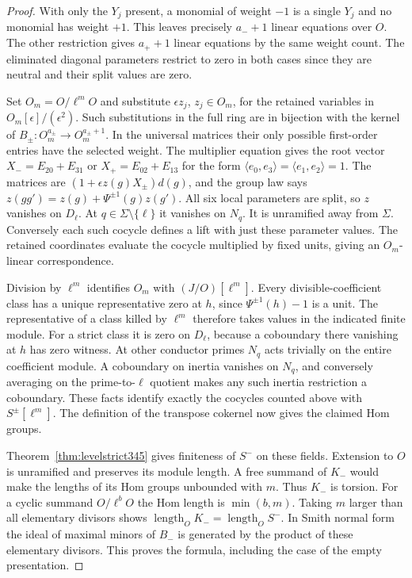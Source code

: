 \documentclass[a4paper,11pt]{article}
\theoremstyle{definition}
\theoremstyle{remark}
\numberwithin{equation}{section}
\begin{document}
\begin{proof}
With only the \(Y_j\) present, a monomial of weight \(-1\) is a
single \(Y_j\) and no monomial has weight \(+1\). This leaves
precisely \(a_-+1\) linear equations over \(O\). The other
restriction gives \(a_++1\) linear equations by the same weight
count. The eliminated diagonal parameters restrict to zero in
both cases since they are neutral and their split values are zero.

Set \(O_m=O/\ell^mO\) and substitute \(\epsilon z_j\),
\(z_j\in O_m\), for the retained variables in
\(O_m[\epsilon]/(\epsilon^2)\). Such substitutions in the full
ring are in bijection with the kernel of \(B_\pm:O_m^{a_\pm}
\to O_m^{a_\pm+1}\). In the universal matrices their only
possible first-order entries have the selected weight.
The multiplier equation gives the root vector \(X_-=E_{20}+E_{31}\)
or \(X_+=E_{02}+E_{13}\) for the form
\(\langle e_0,e_3\rangle=\langle e_1,e_2\rangle=1\).
The matrices are \((1+\epsilon z(g)X_\pm)d(g)\), and the
group law says \(z(gg')=z(g)+\Psi^{\pm1}(g)z(g')\).
All six local parameters are split, so \(z\) vanishes on
\(D_\ell\). At \(q\in\Sigma\setminus\{\ell\}\) it vanishes on
\(N_q\). It is unramified away from \(\Sigma\). Conversely each
such cocycle defines a lift with just these parameter values.
The retained coordinates evaluate the cocycle multiplied by
fixed units, giving an \(O_m\)-linear correspondence.

Division by \(\ell^m\) identifies \(O_m\) with \((J/O)[\ell^m]\).
Every divisible-coefficient class has a unique representative
zero at \(h\), since \(\Psi^{\pm1}(h)-1\) is a unit. The
representative of a class killed by \(\ell^m\) therefore takes
values in the indicated finite module. For a strict class it is
zero on \(D_\ell\), because a coboundary there vanishing at \(h\)
has zero witness. At other conductor primes \(N_q\) acts trivially
on the entire coefficient module. A coboundary on inertia vanishes
on \(N_q\), and conversely averaging on the prime-to-\(\ell\)
quotient makes any such inertia restriction a coboundary.
These facts identify exactly the cocycles counted above with
\(S^\pm[\ell^m]\). The definition of the transpose cokernel now
gives the claimed Hom groups.

Theorem~\ref{thm:levelstrict345} gives finiteness of \(S^-\) on
these fields. Extension to \(O\) is unramified and preserves its
module length. A free summand of \(K_-\) would make the lengths of
its Hom groups unbounded with \(m\). Thus \(K_-\) is torsion.
For a cyclic summand \(O/\ell^bO\) the Hom length is
\(\min(b,m)\). Taking \(m\) larger than all elementary divisors
shows \(\operatorname{length}_O K_-=\operatorname{length}_O S^-\).
In Smith normal form the ideal of maximal minors of \(B_-\) is
generated by the product of these elementary divisors. This proves
the formula, including the case of the empty presentation.
\end{proof}
\end{document}
